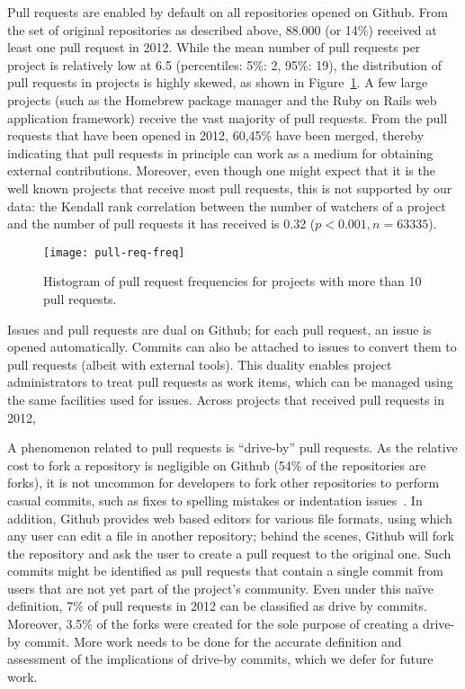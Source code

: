 \documentclass{sig-alternate}
\begin{document}
Pull requests are enabled by default on all repositories opened on Github.  From
the set of original repositories as described above, 88.000 (or 14\%) received
at least one pull request in 2012.  While the mean number of pull requests per
project is relatively low at 6.5 (percentiles: 5\%: 2, 95\%: 19), the
distribution of pull requests in projects is highly skewed, as shown in
Figure~\ref{fig:prfreq}.  A few large projects (such as the Homebrew package
manager and the Ruby on Rails web application framework) receive the vast
majority of pull requests. From the pull requests that have been opened in
2012, 60,45\% have been merged, thereby indicating that pull requests in
principle can work as a medium for obtaining external contributions.  Moreover,
even though one might expect that it is the well known projects that receive
most pull requests, this is not supported by our data: the Kendall rank
correlation between the number of watchers of a project and the number of pull
requests it has received is 0.32 ($p < 0.001, n = 63335$).

\begin{figure}
  \begin{center}
    \texttt{[image: pull-req-freq]}
  \end{center}
  \caption{Histogram of pull request frequencies for projects with more than
  10 pull requests.}
  \label{fig:prfreq}
\end{figure}

Issues and pull requests are dual on Github; for each pull request, an
issue is opened automatically. Commits can also be attached to issues to
convert them to pull requests (albeit with external tools). This duality
enables project administrators to treat pull requests as work items,
which can be managed using the same facilities used for issues.
Across projects that received pull requests in 2012, 

A phenomenon related to pull requests is ``drive-by'' pull requests. As the
relative cost to fork a repository is negligible on Github (54\% of the
repositories are forks), it is not uncommon for developers to fork other
repositories to perform casual commits, such as fixes to spelling mistakes or
indentation issues~\cite{Pham13}. In addition, Github provides web based editors
for various file formats, using which any user can edit a file in another
repository; behind the scenes, Github will fork the repository and ask the user
to create a pull request to the original one. Such commits might be identified
as pull requests that contain a single commit from users that are not yet part
of the project's community. Even under this na\"ive definition, 7\% of pull
requests in 2012 can be classified as drive by commits. Moreover, 3.5\% of the
forks were created for the sole purpose of creating a drive-by commit.  More
work needs to be done for the accurate definition and assessment of the
implications of drive-by commits, which we defer for future work.
\end{document}
